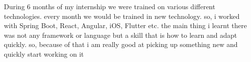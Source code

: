 \documentclass[]{deedy-resume-reversed}
\begin{document}
\begin{minipage}[t]{0.60\textwidth}
\begin{tightemize}
\item During 6 months of my internship we were trained on various different technologies. every month we would be trained in new technology. so, i worked with Spring Boot, React, Angular, iOS, Flutter etc. the main thing i learnt there was not any framework or language but a skill that is how to learn and adapt quickly. so, because of that i am really good at picking up something new and quickly start working on it
\end{tightemize}
\sectionsep





\end{minipage}
\end{document}
